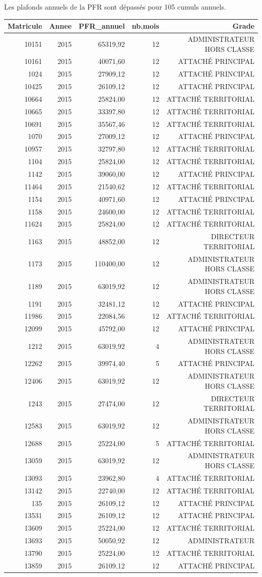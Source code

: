 Les plafonds annuels de la PFR sont dépassés pour 105 cumuls annuels.

\begin{longtable}[]{@{}rrrrr@{}}
\toprule
Matricule & Annee & PFR\_annuel & nb.mois & Grade\tabularnewline
\midrule
\endhead
10151 & 2015 & 65319,92 & 12 & ADMINISTRATEUR HORS CLASSE\tabularnewline
10161 & 2015 & 40071,60 & 12 & ATTACHÉ PRINCIPAL\tabularnewline
1024 & 2015 & 27909,12 & 12 & ATTACHÉ PRINCIPAL\tabularnewline
10425 & 2015 & 26109,12 & 12 & ATTACHÉ PRINCIPAL\tabularnewline
10664 & 2015 & 25824,00 & 12 & ATTACHÉ TERRITORIAL\tabularnewline
10665 & 2015 & 33397,80 & 12 & ATTACHÉ TERRITORIAL\tabularnewline
10691 & 2015 & 35567,46 & 12 & ATTACHÉ TERRITORIAL\tabularnewline
1070 & 2015 & 27009,12 & 12 & ATTACHÉ PRINCIPAL\tabularnewline
10957 & 2015 & 32797,80 & 12 & ATTACHÉ TERRITORIAL\tabularnewline
1104 & 2015 & 25824,00 & 12 & ATTACHÉ TERRITORIAL\tabularnewline
1142 & 2015 & 39060,00 & 12 & ATTACHÉ PRINCIPAL\tabularnewline
11464 & 2015 & 21540,62 & 12 & ATTACHÉ TERRITORIAL\tabularnewline
1154 & 2015 & 40971,60 & 12 & ATTACHÉ PRINCIPAL\tabularnewline
1158 & 2015 & 24600,00 & 12 & ATTACHÉ TERRITORIAL\tabularnewline
11624 & 2015 & 25824,00 & 12 & ATTACHÉ TERRITORIAL\tabularnewline
1163 & 2015 & 48852,00 & 12 & DIRECTEUR TERRITORIAL\tabularnewline
1173 & 2015 & 110400,00 & 12 & ADMINISTRATEUR HORS CLASSE\tabularnewline
1189 & 2015 & 63019,92 & 12 & ADMINISTRATEUR HORS CLASSE\tabularnewline
1191 & 2015 & 32481,12 & 12 & ATTACHÉ PRINCIPAL\tabularnewline
11986 & 2015 & 22084,56 & 12 & ATTACHÉ TERRITORIAL\tabularnewline
12099 & 2015 & 45792,00 & 12 & ATTACHÉ PRINCIPAL\tabularnewline
1212 & 2015 & 63019,92 & 4 & ADMINISTRATEUR HORS CLASSE\tabularnewline
12262 & 2015 & 39974,40 & 5 & ATTACHÉ PRINCIPAL\tabularnewline
12406 & 2015 & 63019,92 & 12 & ADMINISTRATEUR HORS CLASSE\tabularnewline
1243 & 2015 & 27474,00 & 12 & DIRECTEUR TERRITORIAL\tabularnewline
12583 & 2015 & 63019,92 & 12 & ADMINISTRATEUR HORS CLASSE\tabularnewline
12688 & 2015 & 25224,00 & 5 & ATTACHÉ TERRITORIAL\tabularnewline
13059 & 2015 & 63019,92 & 12 & ADMINISTRATEUR HORS CLASSE\tabularnewline
13093 & 2015 & 23962,80 & 4 & ATTACHÉ TERRITORIAL\tabularnewline
13142 & 2015 & 22740,00 & 12 & ATTACHÉ TERRITORIAL\tabularnewline
135 & 2015 & 26109,12 & 12 & ATTACHÉ PRINCIPAL\tabularnewline
13531 & 2015 & 26109,12 & 12 & ATTACHÉ PRINCIPAL\tabularnewline
13609 & 2015 & 25224,00 & 12 & ATTACHÉ TERRITORIAL\tabularnewline
13693 & 2015 & 50050,92 & 12 & ADMINISTRATEUR\tabularnewline
13790 & 2015 & 25224,00 & 12 & ATTACHÉ TERRITORIAL\tabularnewline
13859 & 2015 & 26109,12 & 12 & ATTACHÉ PRINCIPAL\tabularnewline

\end{longtable}
